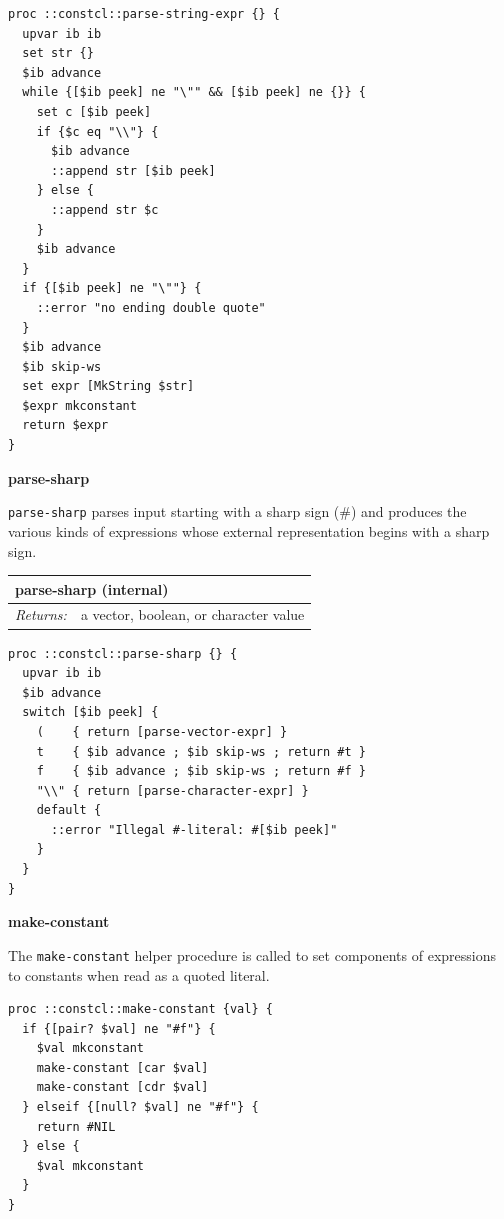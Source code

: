 \documentclass[twoside,9pt]{report}
\begin{document}
\noindent\makebox[\linewidth]{\rule{\linewidth}{0.4pt}}
\begin{lstlisting}
proc ::constcl::parse-string-expr {} {
  upvar ib ib
  set str {}
  $ib advance
  while {[$ib peek] ne "\"" && [$ib peek] ne {}} {
    set c [$ib peek]
    if {$c eq "\\"} {
      $ib advance
      ::append str [$ib peek]
    } else {
      ::append str $c
    }
    $ib advance
  }
  if {[$ib peek] ne "\""} {
    ::error "no ending double quote"
  }
  $ib advance
  $ib skip-ws
  set expr [MkString $str]
  $expr mkconstant
  return $expr
}
\end{lstlisting}
\noindent\makebox[\linewidth]{\rule{\linewidth}{0.4pt}}

\textbf{parse-sharp}


\texttt{parse-sharp} parses input starting with a sharp sign (\#) and produces the various kinds of expressions whose external representation begins with a sharp sign.

\begin{tabular}{ |l l| }
\hline
\multicolumn{2}{|l|}{parse-sharp (internal)} \\
\hline
\textit{Returns:} & a vector, boolean, or character value \\
\hline
\end{tabular}

\noindent\makebox[\linewidth]{\rule{\linewidth}{0.4pt}}
\begin{lstlisting}
proc ::constcl::parse-sharp {} {
  upvar ib ib
  $ib advance
  switch [$ib peek] {
    (    { return [parse-vector-expr] }
    t    { $ib advance ; $ib skip-ws ; return #t }
    f    { $ib advance ; $ib skip-ws ; return #f }
    "\\" { return [parse-character-expr] }
    default {
      ::error "Illegal #-literal: #[$ib peek]"
    }
  }
}
\end{lstlisting}
\noindent\makebox[\linewidth]{\rule{\linewidth}{0.4pt}}

\textbf{make-constant}


The \texttt{make-constant} helper procedure is called to set components of expressions to constants when read as a quoted literal.

\noindent\makebox[\linewidth]{\rule{\linewidth}{0.4pt}}
\begin{lstlisting}
proc ::constcl::make-constant {val} {
  if {[pair? $val] ne "#f"} {
    $val mkconstant
    make-constant [car $val]
    make-constant [cdr $val]
  } elseif {[null? $val] ne "#f"} {
    return #NIL
  } else {
    $val mkconstant
  }
}
\end{lstlisting}
\noindent\makebox[\linewidth]{\rule{\linewidth}{0.4pt}}
\end{document}
